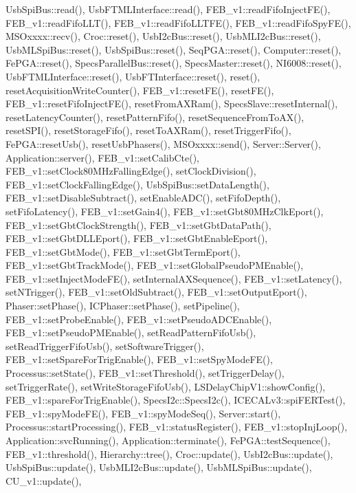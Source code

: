 Usb\+Spi\+Bus\+::read(), Usb\+F\+T\+M\+L\+Interface\+::read(), F\+E\+B\+\_\+v1\+::read\+Fifo\+Inject\+F\+E(), F\+E\+B\+\_\+v1\+::read\+Fifo\+L\+L\+T(), F\+E\+B\+\_\+v1\+::read\+Fifo\+L\+L\+T\+F\+E(), F\+E\+B\+\_\+v1\+::read\+Fifo\+Spy\+F\+E(), M\+S\+Oxxxx\+::recv(), Croc\+::reset(), Usb\+I2c\+Bus\+::reset(), Usb\+M\+L\+I2c\+Bus\+::reset(), Usb\+M\+L\+Spi\+Bus\+::reset(), Usb\+Spi\+Bus\+::reset(), Seq\+P\+G\+A\+::reset(), Computer\+::reset(), Fe\+P\+G\+A\+::reset(), Specs\+Parallel\+Bus\+::reset(), Specs\+Master\+::reset(), N\+I6008\+::reset(), Usb\+F\+T\+M\+L\+Interface\+::reset(), Usb\+F\+T\+Interface\+::reset(), reset(), reset\+Acquisition\+Write\+Counter(), F\+E\+B\+\_\+v1\+::reset\+F\+E(), reset\+F\+E(), F\+E\+B\+\_\+v1\+::reset\+Fifo\+Inject\+F\+E(), reset\+From\+A\+X\+Ram(), Specs\+Slave\+::reset\+Internal(), reset\+Latency\+Counter(), reset\+Pattern\+Fifo(), reset\+Sequence\+From\+To\+A\+X(), reset\+S\+P\+I(), reset\+Storage\+Fifo(), reset\+To\+A\+X\+Ram(), reset\+Trigger\+Fifo(), Fe\+P\+G\+A\+::reset\+Usb(), reset\+Usb\+Phasers(), M\+S\+Oxxxx\+::send(), Server\+::\+Server(), Application\+::server(), F\+E\+B\+\_\+v1\+::set\+Calib\+Cte(), F\+E\+B\+\_\+v1\+::set\+Clock80\+M\+Hz\+Falling\+Edge(), set\+Clock\+Division(), F\+E\+B\+\_\+v1\+::set\+Clock\+Falling\+Edge(), Usb\+Spi\+Bus\+::set\+Data\+Length(), F\+E\+B\+\_\+v1\+::set\+Disable\+Subtract(), set\+Enable\+A\+D\+C(), set\+Fifo\+Depth(), set\+Fifo\+Latency(), F\+E\+B\+\_\+v1\+::set\+Gain4(), F\+E\+B\+\_\+v1\+::set\+Gbt80\+M\+Hz\+Clk\+Eport(), F\+E\+B\+\_\+v1\+::set\+Gbt\+Clock\+Strength(), F\+E\+B\+\_\+v1\+::set\+Gbt\+Data\+Path(), F\+E\+B\+\_\+v1\+::set\+Gbt\+D\+L\+L\+Eport(), F\+E\+B\+\_\+v1\+::set\+Gbt\+Enable\+Eport(), F\+E\+B\+\_\+v1\+::set\+Gbt\+Mode(), F\+E\+B\+\_\+v1\+::set\+Gbt\+Term\+Eport(), F\+E\+B\+\_\+v1\+::set\+Gbt\+Track\+Mode(), F\+E\+B\+\_\+v1\+::set\+Global\+Pseudo\+P\+M\+Enable(), F\+E\+B\+\_\+v1\+::set\+Inject\+Mode\+F\+E(), set\+Internal\+A\+X\+Sequence(), F\+E\+B\+\_\+v1\+::set\+Latency(), set\+N\+Trigger(), F\+E\+B\+\_\+v1\+::set\+Old\+Subtract(), F\+E\+B\+\_\+v1\+::set\+Output\+Eport(), Phaser\+::set\+Phase(), I\+C\+Phaser\+::set\+Phase(), set\+Pipeline(), F\+E\+B\+\_\+v1\+::set\+Probe\+Enable(), F\+E\+B\+\_\+v1\+::set\+Pseudo\+A\+D\+C\+Enable(), F\+E\+B\+\_\+v1\+::set\+Pseudo\+P\+M\+Enable(), set\+Read\+Pattern\+Fifo\+Usb(), set\+Read\+Trigger\+Fifo\+Usb(), set\+Software\+Trigger(), F\+E\+B\+\_\+v1\+::set\+Spare\+For\+Trig\+Enable(), F\+E\+B\+\_\+v1\+::set\+Spy\+Mode\+F\+E(), Processus\+::set\+State(), F\+E\+B\+\_\+v1\+::set\+Threshold(), set\+Trigger\+Delay(), set\+Trigger\+Rate(), set\+Write\+Storage\+Fifo\+Usb(), L\+S\+Delay\+Chip\+V1\+::show\+Config(), F\+E\+B\+\_\+v1\+::spare\+For\+Trig\+Enable(), Specs\+I2c\+::\+Specs\+I2c(), I\+C\+E\+C\+A\+Lv3\+::spi\+F\+E\+R\+Test(), F\+E\+B\+\_\+v1\+::spy\+Mode\+F\+E(), F\+E\+B\+\_\+v1\+::spy\+Mode\+Seq(), Server\+::start(), Processus\+::start\+Processing(), F\+E\+B\+\_\+v1\+::status\+Register(), F\+E\+B\+\_\+v1\+::stop\+Inj\+Loop(), Application\+::svc\+Running(), Application\+::terminate(), Fe\+P\+G\+A\+::test\+Sequence(), F\+E\+B\+\_\+v1\+::threshold(), Hierarchy\+::tree(), Croc\+::update(), Usb\+I2c\+Bus\+::update(), Usb\+Spi\+Bus\+::update(), Usb\+M\+L\+I2c\+Bus\+::update(), Usb\+M\+L\+Spi\+Bus\+::update(), C\+U\+\_\+v1\+::update(), 